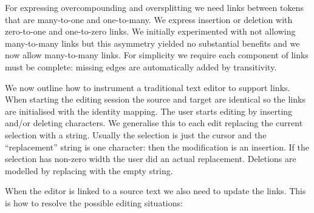 \documentclass[10pt, a4paper]{article}
\newcommand{\dan}[1]{{\color{Fuchsia}{Dan: #1}}}
\begin{document}
For expressing overcompounding and oversplitting we need links between tokens
that are many-to-one and one-to-many. We express insertion or deletion with
zero-to-one and one-to-zero links. We initially experimented with not allowing
many-to-many links but this asymmetry yielded no substantial benefits
and we now allow many-to-many links.
For simplicity we require each component
of links must be complete: missing edges are automatically added by
transitivity.

We now outline how to instrument a traditional text editor to support links.
When starting the editing session the source and target are identical so the
links are initialised with the identity mapping. The user starts editing
by inserting and/or deleting characters.
We generalise this to each edit replacing the current selection with a
string. Usually the selection is just the cursor and the ``replacement'' string
is one character: then the modification is an insertion.
If the selection has non-zero width the user did an actual replacement.
Deletions are modelled by replacing with the empty string.


\dan{update:} 
When the editor is linked to a source text we also need to update the links.
This is how to resolve the possible editing situations:

\dan{
Examples in ascii-art for now!
I intend to make proper (small) screenshots of these on Monday.
}
\end{document}

